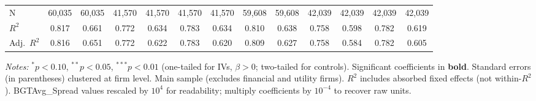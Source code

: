 \documentclass[11pt,a4paper]{article}
\begin{document}
\begin{table}[htbp]
\begin{tabular}{lcccccccccccc}
\midrule
N & 60,035 & 60,035 & 41,570 & 41,570 & 41,570 & 41,570 & 59,608 & 59,608 & 42,039 & 42,039 & 42,039 & 42,039 \\
$R^2$ & 0.817 & 0.661 & 0.772 & 0.634 & 0.783 & 0.634 & 0.810 & 0.638 & 0.758 & 0.598 & 0.782 & 0.619 \\
Adj.~$R^2$ & 0.816 & 0.651 & 0.772 & 0.622 & 0.783 & 0.620 & 0.809 & 0.627 & 0.758 & 0.584 & 0.782 & 0.605 \\
\bottomrule
\end{tabular}
\begin{minipage}{\linewidth}
\vspace{2pt}\scriptsize
\textit{Notes:} $^{*}p<0.10$, $^{**}p<0.05$, $^{***}p<0.01$ (one-tailed for IVs, $\beta > 0$; two-tailed for controls).
 Significant coefficients in \textbf{bold}.
 Standard errors (in parentheses) clustered at firm level.
 Main sample (excludes financial and utility firms).
 $R^2$ includes absorbed fixed effects (not within-$R^2$).
 BGTAvg\_Spread values rescaled by $10^4$ for readability; multiply coefficients by $10^{-4}$ to recover raw units.
\end{minipage}
\end{table}
\clearpage
\end{document}
